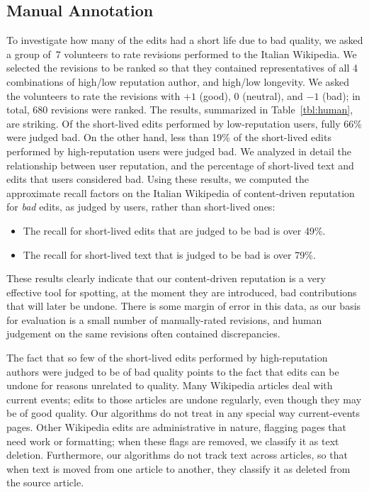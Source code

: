 \subsection{Manual Annotation}

To investigate how many of the edits had a short life due to bad quality,
we asked a group of~7 volunteers to rate revisions performed to the
Italian Wikipedia. 
We selected the revisions to be ranked so that they contained
representatives of all 4 combinations of high/low reputation author,
and high/low longevity. 
We asked the volunteers to rate the revisions with $+1$ (good), 
$0$ (neutral), and $-1$ (bad); in total, 680 revisions
were ranked. 
The results, summarized in Table~\ref{tbl:human}, are striking. 
Of the short-lived edits performed by low-reputation users, fully
66\% were judged bad. 
On the other hand, less than 19\% of the short-lived edits performed by
high-reputation users were judged bad. 
We analyzed in detail the relationship between user reputation, and
the percentage of short-lived text and edits that users considered bad. 
Using these results, we computed the approximate recall factors on the
Italian Wikipedia of content-driven reputation for {\em bad\/} edits,
as judged by users, rather than short-lived ones:
%
\begin{itemize}

\item The recall for short-lived edits that are judged to be bad is over
  49\%.

\item The recall for short-lived text that is judged to be bad is over
  79\%.

\end{itemize}
%
These results clearly indicate that our content-driven reputation is a
very effective tool for spotting, at the moment they are introduced,
bad contributions that will later be undone. 
There is some margin of error in this data, as our basis for
evaluation is a small number of manually-rated revisions, and human
judgement on the same revisions often contained discrepancies. 

The fact that so few of the short-lived edits performed by
high-reputation authors were judged to be of bad quality points to the
fact that edits can be undone for reasons unrelated to quality. 
Many Wikipedia articles deal with current events; edits to those
articles are undone regularly, even though they may be of good
quality. 
Our algorithms do not treat in any special way current-events pages. 
Other Wikipedia edits are administrative in nature, flagging pages that
need work or formatting; when these flags are removed, we classify it
as text deletion. 
Furthermore, our algorithms do not track text across articles, so that
when text is moved from one article to another, they classify it as
deleted from the source article.

